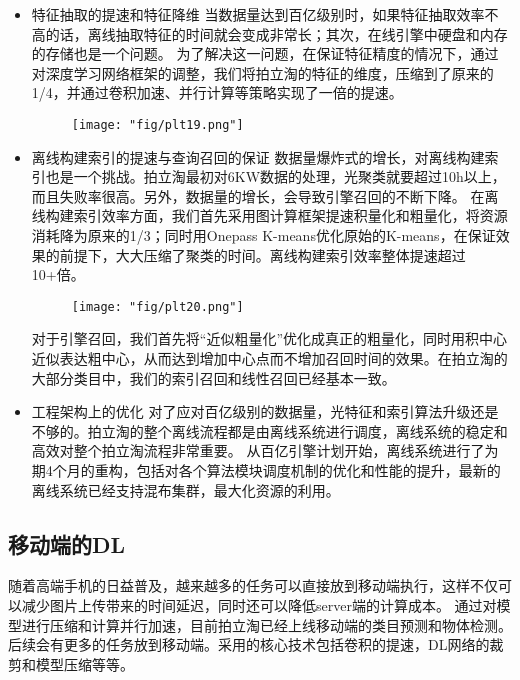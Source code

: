 \begin{itemize}
\item 特征抽取的提速和特征降维
当数据量达到百亿级别时，如果特征抽取效率不高的话，离线抽取特征的时间就会变成非常长；其次，在线引擎中硬盘和内存的存储也是一个问题。
为了解决这一问题，在保证特征精度的情况下，通过对深度学习网络框架的调整，我们将拍立淘的特征的维度，压缩到了原来的1/4，并通过卷积加速、并行计算等策略实现了一倍的提速。

\begin{figure}[!h]
	\centering
	\texttt{[image: "fig/plt19.png"]}
	\caption{}
	\label{fig:plt19}
\end{figure}
\item 离线构建索引的提速与查询召回的保证
数据量爆炸式的增长，对离线构建索引也是一个挑战。拍立淘最初对6KW数据的处理，光聚类就要超过10h以上，而且失败率很高。另外，数据量的增长，会导致引擎召回的不断下降。
在离线构建索引效率方面，我们首先采用图计算框架提速积量化和粗量化，将资源消耗降为原来的1/3；同时用Onepass K-means优化原始的K-means，在保证效果的前提下，大大压缩了聚类的时间。离线构建索引效率整体提速超过10+倍。

\begin{figure}[!h]
	\centering
	\texttt{[image: "fig/plt20.png"]}
	\caption{}
	\label{fig:plt20}
\end{figure}

对于引擎召回，我们首先将“近似粗量化”优化成真正的粗量化，同时用积中心近似表达粗中心，从而达到增加中心点而不增加召回时间的效果。在拍立淘的大部分类目中，我们的索引召回和线性召回已经基本一致。

\item 工程架构上的优化
对了应对百亿级别的数据量，光特征和索引算法升级还是不够的。拍立淘的整个离线流程都是由离线系统进行调度，离线系统的稳定和高效对整个拍立淘流程非常重要。
从百亿引擎计划开始，离线系统进行了为期4个月的重构，包括对各个算法模块调度机制的优化和性能的提升，最新的离线系统已经支持混布集群，最大化资源的利用。
\end{itemize}

\subsection{移动端的DL}
随着高端手机的日益普及，越来越多的任务可以直接放到移动端执行，这样不仅可以减少图片上传带来的时间延迟，同时还可以降低server端的计算成本。
通过对模型进行压缩和计算并行加速，目前拍立淘已经上线移动端的类目预测和物体检测。后续会有更多的任务放到移动端。采用的核心技术包括卷积的提速，DL网络的裁剪和模型压缩等等。

